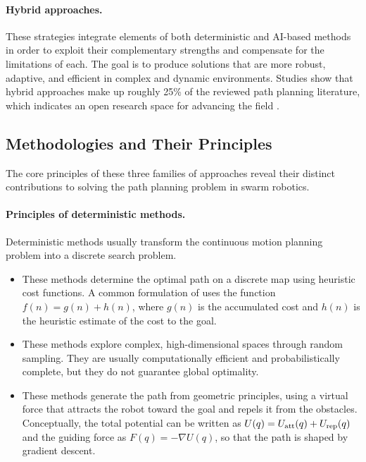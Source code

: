 \paragraph{Hybrid approaches.} These strategies integrate elements of both
deterministic and AI-based methods in order to exploit their complementary
strengths and compensate for the limitations of each. The goal is to produce
solutions that are more robust, adaptive, and efficient in complex and dynamic
environments. Studies show that hybrid approaches make up roughly 25\% of the
reviewed path planning literature, which indicates an open research space for
advancing the field \cite{abujabal2024path}.

\subsection{Methodologies and Their Principles}

The core principles of these three families of approaches reveal their distinct
contributions to solving the path planning problem in swarm robotics.

\paragraph{Principles of deterministic methods.} Deterministic methods usually
transform the continuous motion planning problem into a discrete search problem.
\begin{itemize}
  \item {} These methods determine the
        optimal path on a discrete map using heuristic cost functions. A common
        formulation of \Astar{} uses the function $f(n) = g(n) + h(n)$, where
        $g(n)$ is the accumulated cost and $h(n)$ is the heuristic estimate of the
        cost to the goal.
  \item {} These methods
        explore complex, high-dimensional spaces through random sampling. They
        are usually computationally efficient and probabilistically complete,
        but they do not guarantee global optimality.
  \item {} These methods generate the path
        from geometric principles, using a virtual force that attracts the robot
        toward the goal and repels it from the obstacles. Conceptually, the total
        potential can be written as $U(q) = U_{\mathrm{att}}(q) + U_{\mathrm{rep}}(q)$ and the
        guiding force as $F(q) = -\nabla U(q)$, so that the path is shaped by
        gradient descent.
\end{itemize}

